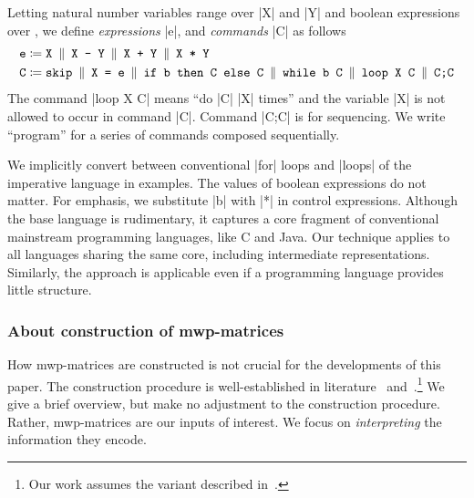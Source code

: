 \begin{definition}\label{def:lang}
Letting natural number variables range over \pr|X| and \pr|Y| and boolean expressions over ,
we define \emph{expressions} \pr|e|, and \emph{commands} \pr|C| as follows
\begin{align*}
    \text{\pr|e|} \coloneqq{ }&
    \text{\pr| X|} \BNF
    \text{\pr|X - Y|} \BNF
    \text{\pr|X + Y|} \BNF
    \text{\pr|X * Y|} \\
    \text{\pr|C|} \coloneqq{ }&
    \text{\pr| skip|} \BNF
    \text{\pr|X = e|} \BNF
    \text{\pr|if b then C else C|} \BNF
    \text{\pr|while b C|} \BNF
    \text{\pr|loop X C|} \BNF
    \text{\pr|C;C|}
\end{align*}
The command \pr|loop X C| means \enquote{do \pr|{C}| \pr|X| times} and the variable \pr|X| is not allowed to occur in command \pr|C|.
Command \pr|C;C| is for sequencing.
We write \enquote{program} for a series of commands composed sequentially.
\end{definition}
We implicitly convert between conventional \prc|for| loops and \pr|loops| of the imperative language in examples.
The values of boolean expressions do not matter.
For emphasis, we substitute \pr|b| with \pr|*| in control expressions.
Although the base language is rudimentary, it captures a core fragment of conventional mainstream programming languages, like C and Java.
Our technique applies to all languages sharing the same core, including intermediate representations.
Similarly, the approach is applicable even if a programming language provides little structure.

\subsubsection{About construction of mwp-matrices}
\label{subsec:matrices}

How mwp-matrices are constructed is not crucial for the developments of this paper.
The construction procedure is well-established in literature~\cite[Sect. 5--6]{jones2009} and~\cite[Sect. 2--3]{aubert20222}.\footnote{Our work assumes the variant described in~\cite{aubert20222}.}
We give a brief overview, but make no adjustment to the construction procedure.
Rather, mwp-matrices are our inputs of interest.
We focus on \emph{interpreting} the information they encode.

